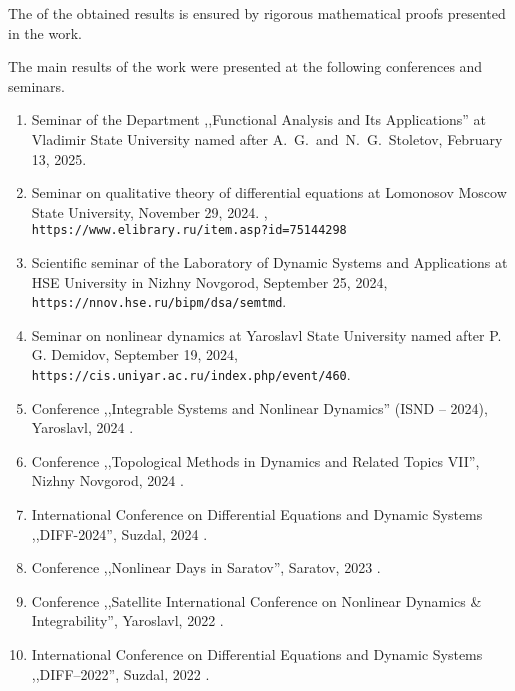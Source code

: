 
\bigskip

The {\reliability} of the obtained results is ensured by rigorous mathematical proofs presented in the work. %

\nocite{scbib1, wosbib1, wosbib2}

\bigskip

{\probation}
The main results of the work were presented at the following conferences and seminars.
\begin{enumerate}
	\item Seminar of the Department ,,Functional Analysis and Its Applications'' at Vladimir State University named after A.~G.~and~N.~G.~Stoletov, February 13, 2025.
	\item Seminar on qualitative theory of differential equations at Lomonosov Moscow State University, November 29, 2024. \cite{Sergeev2024},\\\texttt{https://www.elibrary.ru/item.asp?id=75144298}
	\item Scientific seminar of the Laboratory of Dynamic Systems and Applications at HSE University in Nizhny Novgorod, September 25, 2024,\\\texttt{https://nnov.hse.ru/bipm/dsa/semtmd}.
	\item Seminar on nonlinear dynamics at Yaroslavl State University named after P. G. Demidov, September 19, 2024,\\\texttt{https://cis.uniyar.ac.ru/index.php/event/460}.
	\item Conference ,,Integrable Systems and Nonlinear Dynamics'' (ISND – 2024), Yaroslavl, 2024 \cite{confbib5}.
	\item Conference ,,Topological Methods in Dynamics and Related Topics VII'', Nizhny Novgorod, 2024 \cite{confbib6}.
	\item International Conference on Differential Equations and Dynamic Systems ,,DIFF-2024'',  Suzdal, 2024 \cite{confbib3}.
	\item Conference ,,Nonlinear Days in Saratov'', Saratov, 2023 \cite{confbib2}.
	\item Conference ,,Satellite International Conference on Nonlinear Dynamics {\&} Integrability'', Yaroslavl, 2022 \cite{confbib4}.
	\item International Conference on Differential Equations and Dynamic Systems ,,DIFF--2022'', Suzdal, 2022 \cite{confbib1}.
\end{enumerate}

